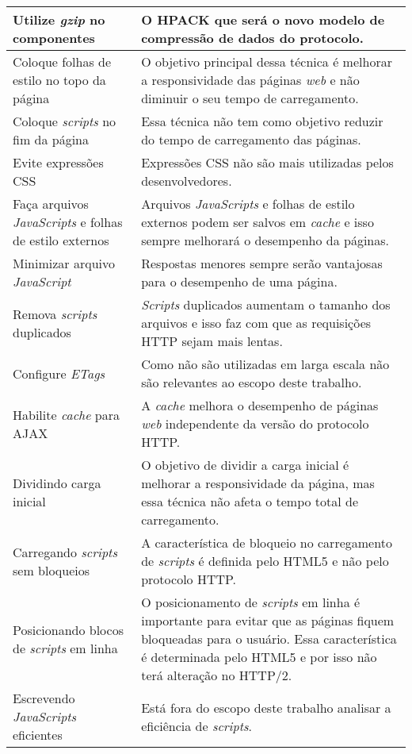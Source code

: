 \begin{tabularx}{\textwidth}{| X | X |}
	\hline
	Utilize \textit{gzip} no componentes & O HPACK que será o novo modelo de compressão de dados do protocolo. \\
	\hline
	Coloque folhas de estilo no topo da página & O objetivo principal dessa técnica é melhorar a responsividade das páginas \textit{web} e não diminuir o seu tempo de carregamento. \\
	\hline
	Coloque \textit{scripts} no fim da página & Essa técnica não tem como objetivo reduzir do tempo de carregamento das páginas. \\
	\hline
	Evite expressões CSS & Expressões CSS não são mais utilizadas pelos desenvolvedores. \\
	\hline
	Faça arquivos \textit{JavaScripts} e folhas de estilo externos & Arquivos \textit{JavaScripts} e folhas de estilo externos podem ser salvos em \textit{cache} e isso sempre melhorará o desempenho da páginas. \\
	\hline
	Minimizar arquivo \textit{JavaScript} & Respostas menores sempre serão vantajosas para o desempenho de uma página. \\
	\hline
	Remova \textit{scripts} duplicados & \textit{Scripts} duplicados aumentam o tamanho dos arquivos e isso faz com que as requisições HTTP sejam mais lentas. \\
	\hline
	Configure \textit{ETags} & Como não são utilizadas em larga escala não são relevantes ao escopo deste trabalho. \\
	\hline
	Habilite \textit{cache} para AJAX & A \textit{cache} melhora o desempenho de páginas \textit{web} independente da versão do protocolo HTTP. \\
	\hline
	Dividindo carga inicial & O objetivo de dividir a carga inicial é melhorar a responsividade da página, mas essa técnica não afeta o tempo total de carregamento. \\
	\hline
	Carregando \textit{scripts} sem bloqueios & A característica de bloqueio no carregamento de \textit{scripts} é definida pelo HTML5 e não pelo protocolo HTTP. \\
	\hline
	Posicionando blocos de \textit{scripts} em linha & O posicionamento de \textit{scripts} em linha é importante para evitar que as páginas fiquem bloqueadas para o usuário. Essa característica é determinada pelo HTML5 e por isso não terá alteração no HTTP/2. \\
	\hline
	Escrevendo \textit{JavaScripts} eficientes & Está fora do escopo deste trabalho analisar a eficiência de \textit{scripts}. \\
	\hline

\end{tabularx}
